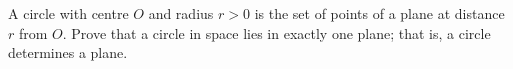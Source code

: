 A circle with centre $O$ and radius $r>0$ is the set of points of a plane at distance $r$ from $O$. Prove that a circle in space lies in exactly one plane; that is, a circle determines a plane.
